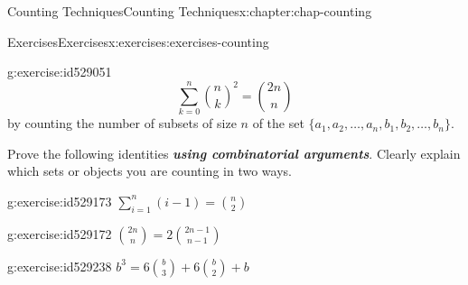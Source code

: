\documentclass[oneside,10pt,]{book}
\newcommand{\alert}[1]{\textbf{\textit{#1}}}
\numberwithin{equation}{section}
\begin{document}
\begin{chapterptx}{Counting Techniques}{}{Counting Techniques}{}{}{x:chapter:chap-counting}
\begin{exercises-section}{Exercises}{}{Exercises}{}{}{x:exercises:exercises-counting}
\begin{divisionexercise}{25}{}{}{g:exercise:id529051}
\begin{equation*}
\sum_{k=0}^n \binom{n}{k}^2 = \binom{2n}{n}
\end{equation*}
by counting the number of subsets of size \(n\) of the set \(\{a_1,a_2,\ldots,a_n,b_1,b_2,\ldots,b_n\}\).%
\end{divisionexercise}%
\par\medskip\noindent%
%
Prove the following identities \alert{using combinatorial arguments}. Clearly explain which sets or objects you are counting in two ways.%
\begin{exercisegroup}
\begin{divisionexerciseeg}{26}{}{}{g:exercise:id529173}%
\(\displaystyle\sum_{i=1}^n (i-1) = \binom{n}{2}\)%
\end{divisionexerciseeg}%
\begin{divisionexerciseeg}{27}{}{}{g:exercise:id529172}%
\(\displaystyle\binom{2n}{n} = 2\binom{2n-1}{n-1}\)%
\end{divisionexerciseeg}%
\begin{divisionexerciseeg}{28}{}{}{g:exercise:id529238}%
\(\displaystyle b^3 = 6\binom{b}{3} + 6\binom{b}{2} + b\)%
\end{divisionexerciseeg}%
\end{exercisegroup}
\par\medskip\noindent
\end{exercises-section}
\end{chapterptx}
%
%
\typeout{************************************************}
\typeout{************************************************}
%
\end{document}
